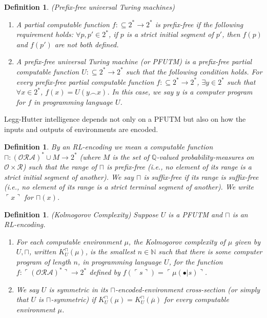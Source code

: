\documentclass{article}
\newtheorem{definition}[theorem]{Definition}
\begin{document}
\begin{definition}
    (Prefix-free universal Turing machines)
    \begin{enumerate}
        \item A partial computable function $f:\subseteq 2^*\to 2^*$
        is \emph{prefix-free} if the following requirement holds:
        $\forall p,p'\in 2^*$, if $p$ is a strict initial segment of $p'$,
        then $f(p)$ and $f(p')$ are not both defined.
        \item A \emph{prefix-free universal Turing machine}
        (or \emph{PFUTM}) is a prefix-free
        partial computable function $U:\subseteq 2^*\to 2^*$
        such that the following condition holds.
        For every prefix-free partial computable function
        $f:\subseteq 2^*\to 2^*$, $\exists y\in 2^*$ such that
        $\forall x\in 2^*$, $f(x)=U(y\frown x)$.
        In this case, we say $y$ is a \emph{computer program for
        $f$ in programming language $U$}.
    \end{enumerate}
\end{definition}

Legg-Hutter intelligence depends not only on a PFUTM but also on how
the inputs and outputs of environments are encoded.

\begin{definition}
    By an \emph{RL-encoding} we mean a computable function
    $\sqcap:(\mathcal O\mathcal R\mathcal A)^*\cup M\to 2^*$
    (where $M$ is the set of $\mathbb Q$-valued probability-measures
    on $\mathcal O\times\mathcal R$) such that the range of
    $\sqcap$ is prefix-free (i.e., no element of its range is a
    strict initial segment of another). We say $\sqcap$ is
    \emph{suffix-free} if its range is suffix-free (i.e., no element
    of its range is a strict terminal segment of another).
    We write $\ulcorner x\urcorner$ for $\sqcap(x)$.
\end{definition}

\begin{definition}
(Kolmogorov Complexity)
Suppose $U$ is a PFUTM and $\sqcap$ is an RL-encoding.
\begin{enumerate}
    \item
    For each computable environment $\mu$, the \emph{Kolmogorov complexity of $\mu$
    given by $U,\sqcap$}, written $K^\sqcap_U(\mu)$,
    is the smallest $n\in\mathbb N$ such that
    there is some computer program of length $n$, in programming language $U$,
    for the function
    $f:\ulcorner(\mathcal O \mathcal R\mathcal A)^*\urcorner\to 2^*$
    defined by
    $f(\ulcorner s\urcorner)=\ulcorner \mu(\bullet|s)\urcorner$.
    \item
    We say $U$ is \emph{symmetric in its $\sqcap$-encoded-environment
    cross-section} (or simply that $U$ is \emph{$\sqcap$-symmetric}) if
    $K^\sqcap_U(\mu)=K^\sqcap_U(\overline\mu)$ for every computable environment $\mu$.
\end{enumerate}
\end{definition}
\end{document}
